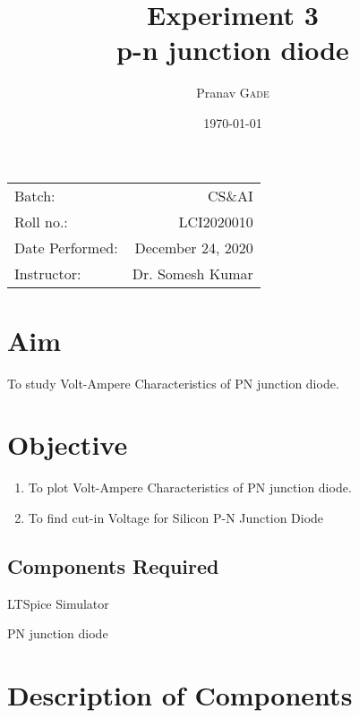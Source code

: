 \documentclass{article}
\title{Experiment 3\\p-n junction diode} %
\author{Pranav \textsc{Gade}} %
\date{\today} %
\begin{document}
	
	\maketitle %
	
	\begin{center}
		\begin{tabular}{l r}
			Batch: & CS\&AI \\
			Roll no.: & LCI2020010 \\
			Date Performed: & December 24, 2020 \\ %
			Instructor: & Dr. Somesh Kumar %
		\end{tabular}
	\end{center}
	
	
	
	\section{Aim}
	
	To study Volt-Ampere Characteristics of PN junction diode.
	
	\section{Objective}
	\begin{enumerate}
		\item To plot Volt-Ampere Characteristics of PN junction diode.
		\item To find cut-in Voltage for Silicon P-N Junction Diode
	\end{enumerate}
	
	\subsection{Components Required}
	\label{definitions}
	\begin{description}
		\setlength\itemsep{0em}
		\item LTSpice Simulator
		\item PN junction diode
	\end{description} 
	
	
	\section{Description of Components}

	
\end{document}
